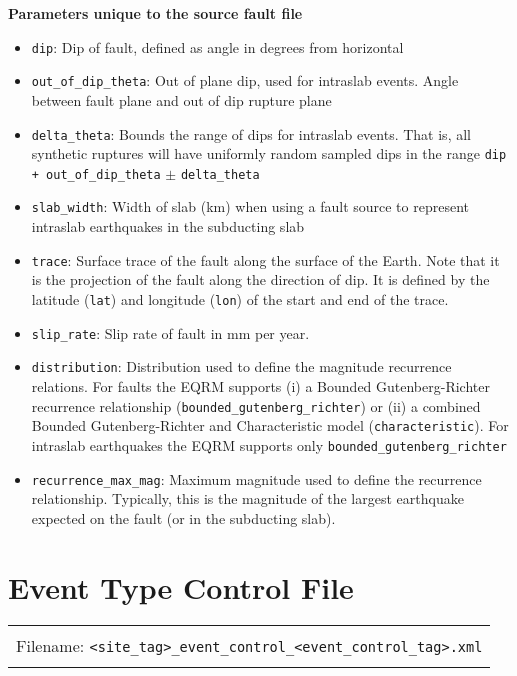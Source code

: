 \textbf{Parameters unique to the source fault file}
\begin{itemize}
\item \texttt{dip}: Dip of fault, defined as angle in degrees from horizontal
\item \texttt{out\_of\_dip\_theta}: Out of plane dip, used for intraslab events. Angle between fault plane
and out of dip rupture plane
\item \texttt{delta\_theta}: Bounds the range of dips for intraslab events. That is,
all synthetic ruptures will have uniformly random sampled dips in
the range \texttt{dip + out\_of\_dip\_theta} $\pm$
\texttt{delta\_theta}
\item \texttt{slab\_width}: Width of slab (km) when using a fault source to represent intraslab
earthquakes in the subducting slab
\item \texttt{trace}: Surface trace of the fault along the surface
of the Earth. Note that it is the projection of the fault along the
direction of dip. It is defined by the latitude (\texttt{lat}) and
longitude (\texttt{lon}) of the start and end of the trace.
\item \texttt{slip\_rate}: Slip rate of fault in mm per year.
\item \texttt{distribution}: Distribution used to define the magnitude recurrence relations. 
For faults the EQRM supports (i) a Bounded Gutenberg-Richter
recurrence relationship
(\texttt{bounded}\texttt{\_gutenberg}\texttt{\_richter}) or (ii) a
combined Bounded Gutenberg-Richter and Characteristic model
(\texttt{characteristic}). For intraslab earthquakes the EQRM
supports only \texttt{bounded}\texttt{\_gutenberg}\texttt{\_richter}
\item \texttt{recurrence\_max\_mag}: Maximum magnitude used to
define the recurrence relationship. Typically, this is the magnitude
of the largest earthquake expected on the fault (or in the
subducting slab).
\end{itemize}

\section{Event Type Control File}

\begin{center}
\begin{tabular}{|c|}
\hline
\\
Filename: \texttt{<site\_tag>\_}\texttt{event\_control\_}\texttt{<event\_control\_tag>}\texttt{.xml}\\
\\
\hline
\end{tabular}
\end{center}

